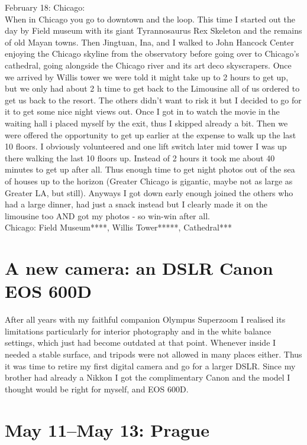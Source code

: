 February 18: Chicago:\\
When in Chicago you go to downtown and the loop. This time I started out the day by Field museum with its giant Tyrannosaurus Rex Skeleton and the remains of old Mayan towns. Then Jingtuan, Ina, and I walked to John Hancock Center enjoying the Chicago skyline from the observatory before going over to Chicago's cathedral, going alongside the Chicago river and its art deco skyscrapers. Once we arrived by Willis tower we were told it might take up to 2 hours to get up, but we only had about 2 h time to get back to the Limousine all of us ordered to get us back to the resort. The others didn't want to risk it but I decided to go for it to get some nice night views out. Once I got in to watch the movie in the waiting hall i placed myself by the exit, thus I skipped already a bit. Then we were offered the opportunity to get up earlier at the expense to walk up the last 10 floors. I obviously volunteered and one lift switch later mid tower I was up there walking the last 10 floors up. Instead of 2 hours it took me about 40 minutes to get up after all. Thus enough time to get night photos out of the sea of houses up to the horizon (Greater Chicago is gigantic, maybe not as large as Greater LA, but still). Anyways I got down early enough joined the others who had a large dinner, had just a snack instead but I clearly made it on the limousine too AND got my photos - so win-win after all.\\

Chicago: Field Museum****, Willis Tower*****, Cathedral***

\section{A new camera: an DSLR Canon EOS 600D}
\label{canon600D}

After all years with my faithful companion Olympus Superzoom I realised its limitations particularly for interior photography and in the white balance settings, which just had become outdated at that point. Whenever inside I needed a stable surface, and tripods were not allowed in many places either. Thus it was time to retire my first digital camera and go for a larger DSLR. Since my brother had already a Nikkon I got the complimentary Canon and the model I thought would be right for myself, and EOS 600D.

\section{May 11--May 13: Prague}
\label{2012Prag}


